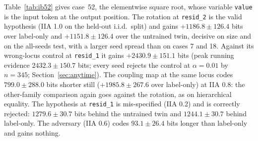 \documentclass[11pt,a4paper]{article}
\begin{document}
Table~\ref{tab:ib52} gives case~52, the elementwise square root, whose variable \texttt{value} is the input token at the output position. The rotation at \texttt{resid\_2} is the valid hypothesis (IIA 1.0 on the held-out i.i.d.\ split) and gains $+1186.8\pm126.4$ bits over label-only and $+1151.8\pm126.4$ over the untrained twin, decisive on size and on the all-seeds test, with a larger seed spread than on cases 7 and 18. Against its wrong-locus control at \texttt{resid\_1} it gains $+2430.9\pm151.1$ bits (peak running evidence $2432.3\pm150.7$ bits; every seed rejects the control at $\alpha=0.01$ by $n=345$; Section~\ref{sec:anytime}). The coupling map at the same locus codes $799.0\pm288.0$ bits shorter still ($+1985.8\pm267.6$ over label-only) at IIA 0.8: the other-family comparison again goes against the rotation, as on hierarchical equality. The hypothesis at \texttt{resid\_1} is mis-specified (IIA 0.2) and is correctly rejected: $1279.6\pm30.7$ bits behind the untrained twin and $1244.1\pm30.7$ behind label-only. The adversary (IIA 0.6) codes $93.1\pm26.4$ bits longer than label-only and gains nothing.
\end{document}
